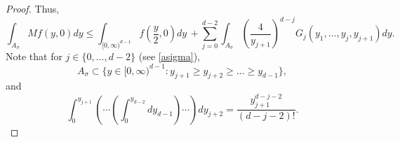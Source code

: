 \documentclass[12pt]{amsart}
\numberwithin{equation}{section}
\theoremstyle{plain}
\theoremstyle{definition}
\theoremstyle{remark}
\begin{document}
\begin{proof}
Thus,
\begin{equation}\label{upper}
  \int_{A_\sigma}Mf(y,0)dy \le
  \int_{[0,\infty)^{d-1}}  f\left(\frac{y}{2},0\right) dy\,
  +\sum_{j=0}^{d-2}\int_{A_\sigma}\left(\frac{4}{y_{j+1}}\right)^{d-j}
  G_j(y_1,\ldots,y_j,y_{j+1})dy.
\end{equation}
Note that for $j\in\{0,\ldots,d-2\}$ (see \ref{asigma}),
\begin{equation}\label{bigger}
A_\sigma\subset \{y\in [0,\infty)^{d-1} : y_{j+1}\ge
  y_{j+2}\ge \ldots \ge y_{d-1}\},
\end{equation}
and
\begin{equation}\label{simplex}
\int_0^{y_{j+1}}\left( \cdots\left( \int_0^{y_{d-2}}dy_{d-1}\right)
\cdots
\right) dy_{j+2} =\frac{y_{j+1}^{d-j-2}}{(d-j-2)!}.
\end{equation}


\end{proof}
\end{document}
